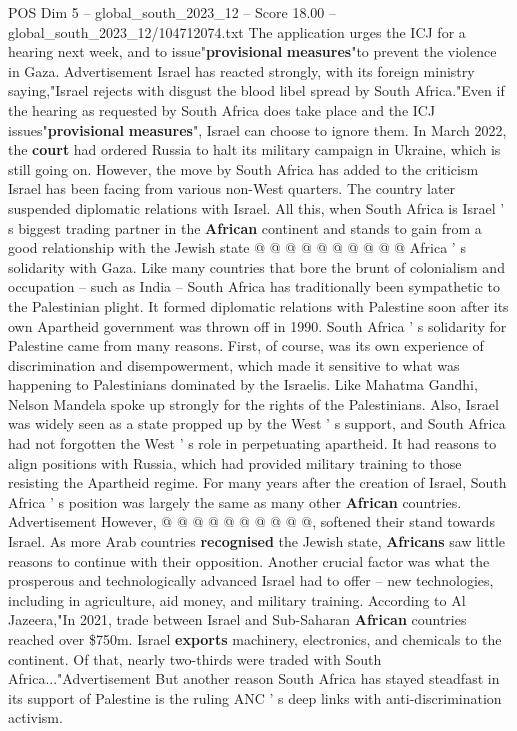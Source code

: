 \begin{textsample}{POS Dim 5 – global\_south\_2023\_12 – Score 18.00 – global\_south\_2023\_12/104712074.txt}
The application urges the ICJ for a hearing next week, and to issue"\textbf{provisional} \textbf{measures}"to prevent the violence in Gaza.
Advertisement Israel has reacted strongly, with its foreign ministry saying,"Israel rejects with disgust the blood libel spread by South Africa."Even if the hearing as requested by South Africa does take place and the ICJ issues"\textbf{provisional} \textbf{measures}", Israel can choose to ignore them.
In March 2022, the \textbf{court} had ordered Russia to halt its military campaign in Ukraine, which is still going on.
However, the move by South Africa has added to the criticism Israel has been facing from various non-West quarters.
The country later suspended diplomatic relations with Israel.
All this, when South Africa is Israel ' s biggest trading partner in the \textbf{African} continent and stands to gain from a good relationship with the Jewish state @ @ @ @ @ @ @ @ @ @ Africa ' s solidarity with Gaza.
Like many countries that bore the brunt of colonialism and occupation -- such as India -- South Africa has traditionally been sympathetic to the Palestinian plight.
It formed diplomatic relations with Palestine soon after its own Apartheid government was thrown off in 1990.
South Africa ' s solidarity for Palestine came from many reasons.
First, of course, was its own experience of discrimination and disempowerment, which made it sensitive to what was happening to Palestinians dominated by the Israelis.
Like Mahatma Gandhi, Nelson Mandela spoke up strongly for the rights of the Palestinians.
Also, Israel was widely seen as a state propped up by the West ' s support, and South Africa had not forgotten the West ' s role in perpetuating apartheid.
It had reasons to align positions with Russia, which had provided military training to those resisting the Apartheid regime.
For many years after the creation of Israel, South Africa ' s position was largely the same as many other \textbf{African} countries.
Advertisement However, @ @ @ @ @ @ @ @ @ @, softened their stand towards Israel.
As more Arab countries \textbf{recognised} the Jewish state, \textbf{Africans} saw little reasons to continue with their opposition.
Another crucial factor was what the prosperous and technologically advanced Israel had to offer -- new technologies, including in agriculture, aid money, and military training.
According to Al Jazeera,"In 2021, trade between Israel and Sub-Saharan \textbf{African} countries reached over \$750m.
Israel \textbf{exports} machinery, electronics, and chemicals to the continent.
Of that, nearly two-thirds were traded with South Africa..."Advertisement But another reason South Africa has stayed steadfast in its support of Palestine is the ruling ANC ' s deep links with anti-discrimination activism.

\end{textsample}
